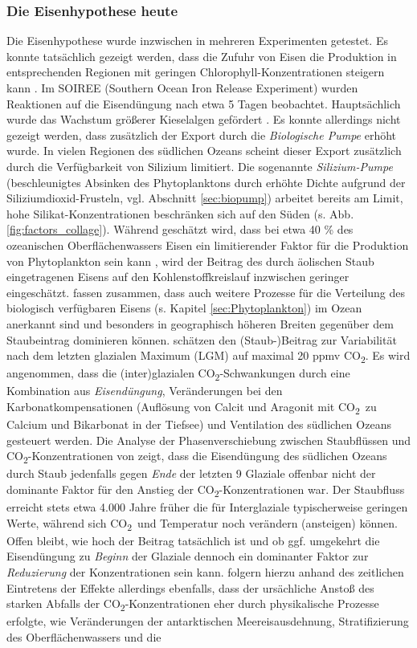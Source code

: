 \documentclass[12pt,a4paper,onecolumn]{scrartcl}
\newcommand{\cotwo}{CO\textsubscript{2}}
\begin{document}
\subsubsection{Die Eisenhypothese heute}
Die Eisenhypothese wurde inzwischen in mehreren Experimenten getestet. Es konnte tatsächlich gezeigt werden, dass die Zufuhr von Eisen die Produktion in entsprechenden Regionen mit geringen Chlorophyll-Konzentrationen steigern kann \citep{Boyd.2007}. Im SOIREE (Southern Ocean Iron Release Experiment) wurden Reaktionen auf die Eisendüngung nach etwa 5 Tagen beobachtet. Hauptsächlich wurde das Wachstum größerer Kieselalgen gefördert \citep{Trull.2001}. Es konnte allerdings nicht gezeigt werden, dass zusätzlich der Export durch die \textit{Biologische Pumpe} erhöht wurde. In vielen Regionen des südlichen Ozeans scheint dieser Export zusätzlich durch die Verfügbarkeit von Silizium limitiert. Die sogenannte \textit{Silizium-Pumpe} (beschleunigtes Absinken des Phytoplanktons durch erhöhte Dichte aufgrund der Siliziumdioxid-Frusteln, vgl. Abschnitt \ref{sec:biopump}) arbeitet bereits am Limit, hohe Silikat-Konzentrationen beschränken sich auf den Süden (s. Abb. \ref{fig:factors_collage}). Während geschätzt wird, dass bei etwa 40 \% des ozeanischen Oberflächenwassers Eisen ein limitierender Faktor für die Produktion von Phytoplankton sein kann \citep{Emerson.2009}, wird der Beitrag des durch äolischen Staub eingetragenen Eisens auf den Kohlenstoffkreislauf inzwischen geringer eingeschätzt. \citet{Tagliabue.2017} fassen zusammen, dass auch weitere Prozesse für die Verteilung des biologisch verfügbaren Eisens (s. Kapitel \ref{sec:Phytoplankton}) im Ozean anerkannt sind und besonders in geographisch höheren Breiten gegenüber dem Staubeintrag dominieren können. \citet{Vallelonga.2013} schätzen den (Staub-)Beitrag zur Variabilität nach dem letzten glazialen Maximum (LGM) auf maximal 20 ppmv \cotwo . Es wird angenommen, dass die (inter)glazialen \cotwo -Schwankungen durch eine Kombination aus \textit{Eisendüngung}, Veränderungen bei den Karbonatkompensationen (Auflösung von Calcit und Aragonit mit  \cotwo \ zu Calcium und Bikarbonat in der Tiefsee) und Ventilation des südlichen Ozeans \citep{Lambert.2012} gesteuert werden. Die Analyse der Phasenverschiebung zwischen Staubflüssen und \cotwo -Konzentrationen von \citet{Lambert.2012} zeigt, dass die Eisendüngung des südlichen Ozeans durch Staub jedenfalls gegen \textit{Ende} der letzten 9 Glaziale offenbar nicht der dominante Faktor für den Anstieg der \cotwo -Konzentrationen war. Der Staubfluss erreicht stets etwa 4.000 Jahre früher die für Interglaziale typischerweise  geringen Werte, während sich \cotwo \ und Temperatur noch verändern (ansteigen) können. Offen bleibt, wie hoch der Beitrag tatsächlich ist und ob ggf. umgekehrt die Eisendüngung zu \textit{Beginn} der Glaziale dennoch ein dominanter Faktor zur \textit{Reduzierung} der Konzentrationen sein kann. \citet{MartinezGarcia.2009} folgern hierzu anhand des zeitlichen Eintretens der Effekte allerdings ebenfalls, dass der ursächliche Anstoß des starken Abfalls der \cotwo -Konzentrationen eher durch physikalische Prozesse erfolgte, wie Veränderungen der antarktischen Meereisausdehnung, Stratifizierung des Oberflächenwassers und die 
\end{document}
